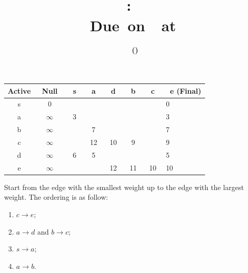 \documentclass[12pt,letterpaper,titlepage,en-US]{article}
\title{
    \vspace{2in}
    \textmd{\textbf{\hmwkClassName \\\hmwkClass:\ \hmwkTitle}}\\
    \normalsize\vspace{0.1in}\small{Due\ on\ \DTMusedate{DueDate}\ at \DTMusetime{DueDate} }\\
    \vspace{0.1in}\large{\textit{\hmwkClassInstructor}}
    \vspace{3in}
}
\author{\textbf{\hmwkAuthorName\ \footnotesize{(\hmwkAuthorNetID)}} \\  \hmwkAuthorUTDEmail}
\date{}
\begin{document}
\maketitle


\tableofcontents

\pagebreak
{}


\begin{homeworkProblem}
    \begin{homeworkSubProblem}
\begin{table}[H]
    \centering
    \begin{tabular}{c||ccccccl}
        Active &\ Null\ &\ s\ &\ a\ &\ d\ &\ b\ &\ c\ &\ e \tiny{(Final)}\\\hline\hline
        s & $0$ & & & & & & 0\\\hline
        a & $\infty$ & 3 & & & & & 3\\\hline
        b & $\infty$ & & 7 & & & & 7\\\hline
        c & $\infty$ & & 12 & 10 & 9 & & 9\\\hline
        d & $\infty$ & 6 & 5 & & & & 5\\\hline
        e & $\infty$ & & & 12 & 11 & 10 & 10\\
    \end{tabular}
\end{table}
\end{homeworkSubProblem}

\begin{homeworkSubProblem}
Start from the edge with the smallest weight up to the edge with the largest weight.
The ordering is as follow:
\begin{enumerate}
    \item $c \rightarrow e$;
    \item $a \rightarrow d$ and $b \rightarrow c$;
    \item $s \rightarrow a$;
    \item $a \rightarrow b$.
\end{enumerate}
\end{homeworkSubProblem}
\end{homeworkProblem}
\end{document}
